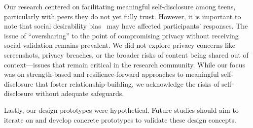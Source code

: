Our research centered on facilitating meaningful self-disclosure among teens, particularly with peers they do not yet fully trust. However, it is important to note that social desirability bias~\cite{fisher1993social} may have affected participants' responses. The issue of ``oversharing'' to the point of compromising privacy without receiving social validation remains prevalent. We did not explore privacy concerns like screenshots, privacy breaches, or the broader risks of content being shared out of context---issues that remain critical in the research community. While our focus was on strength-based and resilience-forward approaches to meaningful self-disclosure that foster relationship-building, we acknowledge the risks of self-disclosure without adequate safeguards.

Lastly, our design prototypes were hypothetical. Future studies should aim to iterate on and develop concrete prototypes to validate these design concepts.
